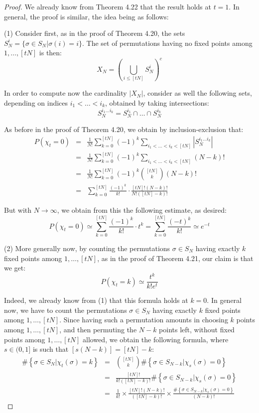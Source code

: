 \documentclass[12pt]{amsbook}
\begin{document}
\begin{proof}
We already know from Theorem 4.22 that the result holds at $t=1$. In general, the proof is similar, the idea being as follows:

\medskip

(1) Consider first, as in the proof of Theorem 4.20, the sets $S_N^i=\{\sigma\in S_N|\sigma(i)=i\}$. The set of permutations having no fixed points among $1,\ldots,[tN]$ is then:
$$X_N=\left(\bigcup_{i\leq[tN]}S_N^i\right)^c$$

In order to compute now the cardinality $|X_N|$, consider as well the following sets, depending on indices $i_1<\ldots<i_k$, obtained by taking intersections:
$$S_N^{i_1\ldots i_k}=S_N^{i_1}\cap\ldots\cap S_N^{i_k}$$

As before in the proof of Theorem 4.20, we obtain by inclusion-exclusion that:
\begin{eqnarray*}
P(\chi_t=0)
&=&\frac{1}{N!}\sum_{k=0}^{[tN]}(-1)^k\sum_{i_1<\ldots<i_k<[tN]}|S_N^{i_1\ldots i_k}|\\
&=&\frac{1}{N!}\sum_{k=0}^{[tN]}(-1)^k\sum_{i_1<\ldots<i_k<[tN]}(N-k)!\\
&=&\frac{1}{N!}\sum_{k=0}^{[tN]}(-1)^k\binom{[tN]}{k}(N-k)!\\
&=&\sum_{k=0}^{[tN]}\frac{(-1)^k}{k!}\cdot\frac{[tN]!(N-k)!}{N!([tN]-k)!}
\end{eqnarray*}

But with $N\to\infty$, we obtain from this the following estimate, as desired:
$$P(\chi_t=0)
\simeq\sum_{k=0}^{[tN]}\frac{(-1)^k}{k!}\cdot t^k
=\sum_{k=0}^{[tN]}\frac{(-t)^k}{k!}
\simeq e^{-t}$$

(2) More generally now, by counting the permutations $\sigma\in S_N$ having exactly $k$ fixed points among $1,\ldots,[tN]$, as in the proof of Theorem 4.21, our claim is that we get:
$$P(\chi_t=k)\simeq\frac{t^k}{k!e^t}$$

Indeed, we already know from (1) that this formula holds at $k=0$. In general now, we have to count the permutations $\sigma\in S_N$ having exactly $k$ fixed points among $1,\ldots,[tN]$. Since having such a permutation amounts in choosing $k$ points among $1,\ldots,[tN]$, and then permuting the $N-k$ points left, without fixed points among $1,\ldots,[tN]$ allowed, we obtain the following formula, where $s\in(0,1]$ is such that $[s(N-k)]=[tN]-k$:
\begin{eqnarray*}
\#\left\{\sigma\in S_N\Big|\chi_t(\sigma)=k\right\}
&=&\binom{[tN]}{k}\#\left\{\sigma\in S_{N-k}\Big|\chi_s(\sigma)=0\right\}\\
&=&\frac{[tN]!}{k!([tN]-k)!}\#\left\{\sigma\in S_{N-k}\Big|\chi_s(\sigma)=0\right\}\\
&=&\frac{1}{k!}\times\frac{[tN]!(N-k)!}{([tN]-k)!}\times\frac{\#\left\{\sigma\in S_{N-k}\Big|\chi_s(\sigma)=0\right\}}{(N-k)!}
\end{eqnarray*}


\end{proof}
\end{document}
